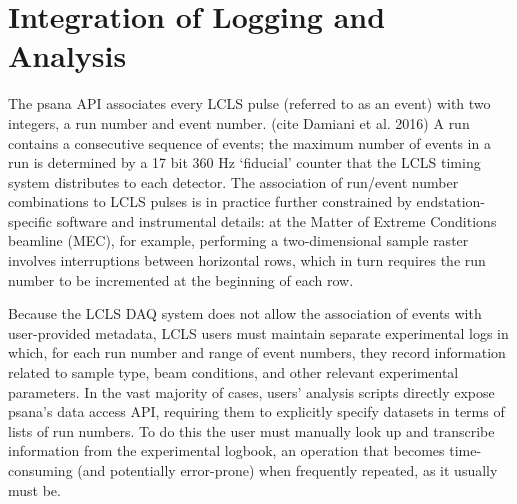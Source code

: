 \section{Integration of Logging and Analysis}
The psana API associates every LCLS pulse (referred to as an event) with two integers, a run number and event number. (cite Damiani et al. 2016) A run contains a consecutive sequence of events; the maximum number of events in a run is determined by a 17 bit 360 Hz `fiducial' counter that the LCLS timing system distributes to each detector. The association of run/event number combinations to LCLS pulses is in practice further constrained by endstation-specific software and instrumental details: at the Matter of Extreme Conditions beamline (MEC), for example, performing a two-dimensional sample raster involves interruptions between horizontal rows, which in turn requires the run number to be incremented at the beginning of each row. 

Because the LCLS DAQ system does not allow the association of events with user-provided metadata, LCLS users must maintain separate experimental logs in which, for each run number and range of event numbers, they record information related to sample type, beam conditions, and other relevant experimental parameters.  In the vast majority of cases, users' analysis scripts directly expose psana's data access API, requiring them to explicitly specify datasets in terms of lists of run numbers. To do this the user must manually look up and transcribe information from the experimental logbook, an operation that becomes time-consuming (and potentially error-prone) when frequently repeated, as it usually must be.

